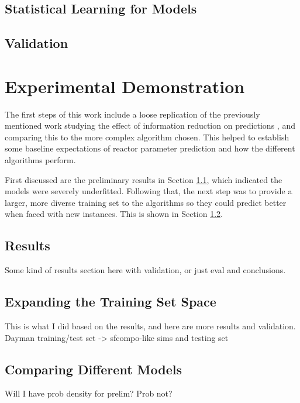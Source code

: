 \subsection{Statistical Learning for Models}
\label{sec:statmodel}



\subsection{Validation}
\label{sec:valid}




\section{Experimental Demonstration}
\label{sec:expdemo}

The first steps of this work include a loose replication of the previously
mentioned work studying the effect of information reduction on predictions
\cite{dayman_feasibility_2013}, and comparing this to the more complex algorithm chosen.
This helped to establish some baseline expectations of reactor
parameter prediction and how the different algorithms perform. 

First discussed are the preliminary results in Section \ref{sec:results}, which
indicated the models were severely underfitted. Following that, the next step
was to provide a larger, more diverse training set to the algorithms so they
could predict better when faced with new instances. This is shown in Section
\ref{sec:newtrain}. 


\subsection{Results}
\label{sec:results}

Some kind of results section here with validation, or just eval and conclusions.

\subsection{Expanding the Training Set Space}
\label{sec:newtrain}

This is what I did based on the results, and here are more results and validation.
Dayman training/test set -> sfcompo-like sims and testing set

\subsection{Comparing Different Models}
\label{sec:compare}

Will I have prob density for prelim? Prob not?
